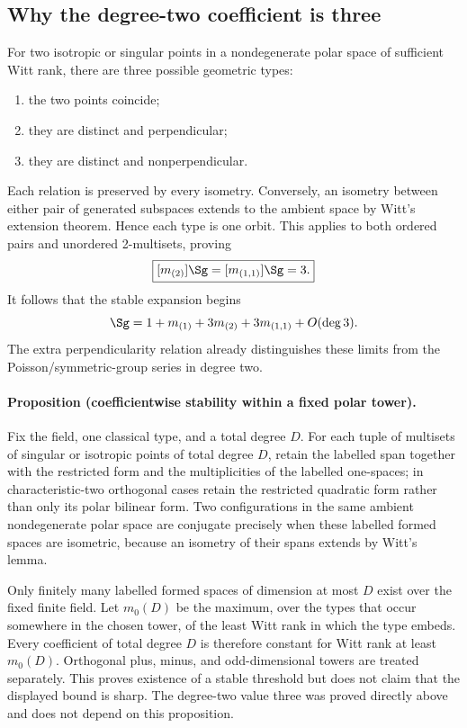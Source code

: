 \documentclass[10pt]{article}
\begin{document}
\subsection{Why the degree-two coefficient is three}
For two isotropic or singular points in a nondegenerate polar space of
sufficient Witt rank, there are three possible geometric types:
\begin{enumerate}
 \item the two points coincide;
 \item they are distinct and perpendicular;
 \item they are distinct and nonperpendicular.
\end{enumerate}
Each relation is preserved by every isometry.  Conversely, an isometry
between either pair of generated subspaces extends to the ambient space by
Witt's extension theorem.  Hence each type is one orbit.  This applies to
both ordered pairs and unordered 2-multisets, proving
\begin{equation}
 \boxed{[m_{(2)}]\Sg=[m_{(1,1)}]\Sg=3.}
\end{equation}
It follows that the stable expansion begins
\[
 \Sg=1+m_{(1)}+3m_{(2)}+3m_{(1,1)}+O(\deg3).
\]
The extra perpendicularity relation already distinguishes these limits from
the Poisson/symmetric-group series in degree two.

\paragraph{Proposition (coefficientwise stability within a fixed polar tower).}
Fix the field, one classical type, and a total degree $D$.  For each tuple of
multisets of singular or isotropic points of total degree $D$, retain the
labelled span together with the restricted form and the multiplicities of the
labelled one-spaces; in characteristic-two orthogonal cases retain the
restricted quadratic form rather than only its polar bilinear form.  Two
configurations in the same ambient nondegenerate polar space are conjugate
precisely when these labelled formed spaces are isometric, because an
isometry of their spans extends by Witt's lemma.

Only finitely many labelled formed spaces of dimension at most $D$ exist over
the fixed finite field.  Let $m_0(D)$ be the maximum, over the types that occur
somewhere in the chosen tower, of the least Witt rank in which the type
embeds.  Every coefficient of total degree $D$ is therefore constant for Witt
rank at least $m_0(D)$.  Orthogonal plus, minus, and odd-dimensional towers
are treated separately.  This proves existence of a stable threshold but
does not claim that the displayed bound is sharp.  The degree-two value three
was proved directly above and does not depend on this proposition.
\end{document}
